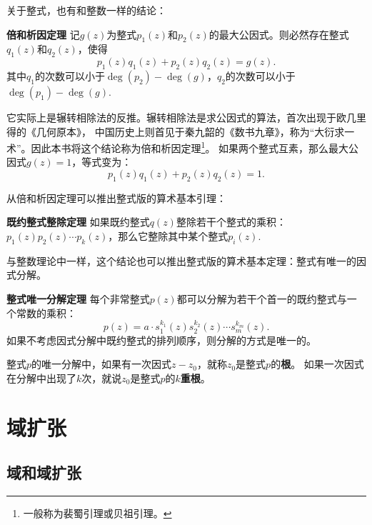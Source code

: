 \documentclass[12pt,UTF8,fontset=none]{ctexbook}
\begin{document}
\begin{appendix}
关于整式，也有和整数一样的结论：
\begin{pp}{\bfseries 倍和析因定理}\label{pp:0_1}
    记$g(z)$为整式$p_1(z)$和$p_2(z)$的最大公因式。则必然存在整式$q_1(z)$和$q_2(z)$，使得
    $$ p_1(z) q_1(z) + p_2(z) q_2(z) = g(z).$$
    其中$q_1$的次数可以小于$\deg(p_2) - \deg(g)$，$q_2$的次数可以小于$\deg(p_1) - \deg(g)$.
\end{pp} 
它实际上是辗转相除法的反推。辗转相除法是求公因式的算法，首次出现于欧几里得的《几何原本》，
中国历史上则首见于秦九韶的《数书九章》，称为“大衍求一术”。因此本书将这个结论称为倍和析因定理\footnote{一般称为裴蜀引理或贝祖引理。}。
如果两个整式互素，那么最大公因式$g(z)=1$，等式变为：
$$ p_1(z) q_1(z) + p_2(z) q_2(z) = 1.$$

从倍和析因定理可以推出整式版的算术基本引理：
\begin{pp}{\bfseries 既约整式整除定理}\label{pp:0_2}
    如果既约整式$q(z)$整除若干个整式的乘积：$p_1(z)p_2(z)\cdots p_k(z)$，那么它整除其中某个整式$p_i(z)$.
\end{pp} 
与整数理论中一样，这个结论也可以推出整式版的算术基本定理：整式有唯一的因式分解。
\begin{pp}{\bfseries 整式唯一分解定理}\label{pp:0_3}
    每个非常整式$p(z)$都可以分解为若干个首一的既约整式与一个常数的乘积：
    $$ p(z) = a\cdot s_1^{k_1}(z)s_2^{k_2}(z)\cdots s_m^{k_m}(z). $$
    如果不考虑因式分解中既约整式的排列顺序，则分解的方式是唯一的。
\end{pp} 

整式$p$的唯一分解中，如果有一次因式$z - z_0$，就称$z_0$是整式$p$的\textbf{根}。
如果一次因式在分解中出现了$k$次，就说$z_0$是整式$p$的$k$\textbf{重根}。

\chapter{域扩张}

\section{域和域扩张}

\end{appendix}
\end{document}
